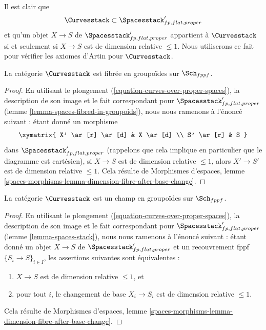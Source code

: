 \medskip\noindent
Il est clair que
\begin{equation}
\label{equation-curves-over-proper-spaces}
\Curvesstack \subset \Spacesstack'_{fp, flat, proper}
\end{equation}
et qu'un objet $X \to S$ de $\Spacesstack'_{fp, flat, proper}$ appartient à
$\Curvesstack$ si et seulement si $X \to S$ est de dimension relative
$\leq 1$. Nous utiliserons ce fait pour vérifier les axiomes d'Artin pour
$\Curvesstack$.

\begin{lemma}
\label{lemma-curves-fibred-in-groupoids}
La catégorie $\Curvesstack$ est fibrée en groupoïdes sur $\Sch_{fppf}$.
\end{lemma}

\begin{proof}
En utilisant le plongement (\ref{equation-curves-over-proper-spaces}),
la description de son image et le fait correspondant pour
$\Spacesstack'_{fp, flat, proper}$
(lemme \ref{lemma-spaces-fibred-in-groupoids}), nous nous ramenons à l'énoncé
suivant : étant donné un morphisme
$$
\xymatrix{
X' \ar[r] \ar[d] & X \ar[d] \\
S' \ar[r] & S
}
$$
dans $\Spacesstack'_{fp, flat, proper}$ (rappelons que cela implique en
particulier que le diagramme est cartésien), si $X \to S$ est de dimension
relative $\leq 1$, alors $X' \to S'$ est de dimension relative $\leq 1$.
Cela résulte de Morphismes d'espaces, lemme
\ref{spaces-morphisms-lemma-dimension-fibre-after-base-change}.
\end{proof}

\begin{lemma}
\label{lemma-curves-stack}
La catégorie $\Curvesstack$ est un champ en groupoïdes sur $\Sch_{fppf}$.
\end{lemma}

\begin{proof}
En utilisant le plongement (\ref{equation-curves-over-proper-spaces}),
la description de son image et le fait correspondant pour
$\Spacesstack'_{fp, flat, proper}$ (lemme \ref{lemma-spaces-stack}),
nous nous ramenons à l'énoncé suivant : étant donné un objet $X \to S$ de
$\Spacesstack'_{fp, flat, proper}$ et un recouvrement fppf
$\{S_i \to S\}_{i \in I}$, les assertions suivantes sont équivalentes :
\begin{enumerate}
\item $X \to S$ est de dimension relative $\leq 1$, et
\item pour tout $i$, le changement de base $X_i \to S_i$ est de dimension
relative $\leq 1$.
\end{enumerate}
Cela résulte de Morphismes d'espaces, lemme
\ref{spaces-morphisms-lemma-dimension-fibre-after-base-change}.
\end{proof}


